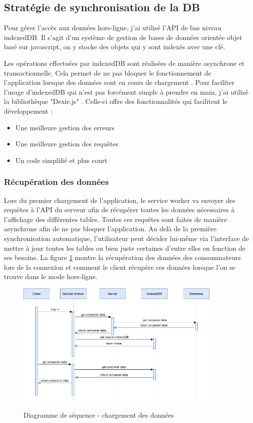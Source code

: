\documentclass{EPL-master-thesis-covers-FR}
\begin{document}
					
			\subsection{Stratégie de synchronisation de la DB}
				Pour gérer l'accès aux données hors-ligne, j'ai utilisé l'API de bas niveau indexedDB. Il s'agit d'un système de gestion de bases de données orientée objet basé sur javascript, on y stocke des objets qui y sont indexés avec une clé. 
				
				Les opérations effectuées par indexedDB sont réalisées de manière asynchrone et transactionnelle. Cela permet de ne pas bloquer le fonctionnement de l'application lorsque des données sont en cours de chargement \cite{ref:indexedDB}. Pour faciliter l'usage d'indexedDB qui n'est pas forcément simple à prendre en main, j'ai utilisé la bibliothèque "Dexie.js" \cite{ref:dexie}. Celle-ci offre des fonctionnalités qui facilitent le développement : 
				\begin{itemize}
					\item Une meilleure gestion des erreurs
					\item Une meilleure gestion des requêtes
					\item Un code simplifié et plus court
				\end{itemize}					
				
				\subsubsection*{Récupération des données}
					Lors du premier chargement de l'application, le service worker va envoyer des requètes à l'API du serveur afin de récupérer toutes les données nécessaires à l'affichage des différentes tables. Toutes ces requêtes sont faites de manière asynchrone afin de ne pas bloquer l'application. Au delà de la première synchronisation automatique, l'utilisateur peut décider lui-même via l'interface de mettre à jour toutes les tables ou bien juste certaines d'entre elles en fonction de ses besoins. La figure \ref{fig:flows} montre la récupération des données des consommateurs lors de la connexion et comment le client récupère ces données lorsque l'on se trouve dans le mode hors-ligne.
					
					\begin{figure}[H]
						\centering
						\includegraphics[width=0.9\textwidth]{images/flow}
						\label{fig:flows}
						\caption{Diagramme de séquence - chargement des données}
					\end{figure}
				
\end{document}
